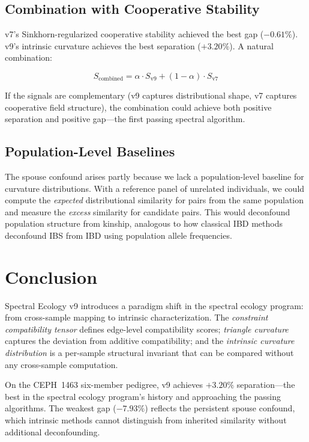 \documentclass{../yalumba}
\begin{document}
\subsection{Combination with Cooperative Stability}

v7's Sinkhorn-regularized cooperative stability achieved the best gap
($-0.61\%$).  v9's intrinsic curvature achieves the best separation
($+3.20\%$).  A natural combination:

\begin{equation}
  S_{\text{combined}} = \alpha \cdot S_{\text{v9}} + (1 - \alpha) \cdot
    S_{\text{v7}}
  \label{eq:combined}
\end{equation}

If the signals are complementary (v9 captures distributional shape, v7
captures cooperative field structure), the combination could achieve
both positive separation and positive gap---the first passing spectral
algorithm.

\subsection{Population-Level Baselines}

The spouse confound arises partly because we lack a population-level
baseline for curvature distributions.  With a reference panel of unrelated
individuals, we could compute the \emph{expected} distributional similarity
for pairs from the same population and measure the \emph{excess} similarity
for candidate pairs.  This would deconfound population structure from
kinship, analogous to how classical IBD methods deconfound IBS from IBD
using population allele frequencies.


\section{Conclusion}
\label{sec:conclusion}

Spectral Ecology v9 introduces a paradigm shift in the spectral ecology
program: from cross-sample mapping to intrinsic characterization.  The
\emph{constraint compatibility tensor} defines edge-level compatibility
scores; \emph{triangle curvature} captures the deviation from additive
compatibility; and the \emph{intrinsic curvature distribution} is a
per-sample structural invariant that can be compared without any cross-sample
computation.

On the CEPH~1463 six-member pedigree, v9 achieves $+3.20\%$ separation---the
best in the spectral ecology program's history and approaching the passing
algorithms.  The weakest gap ($-7.93\%$) reflects the persistent spouse
confound, which intrinsic methods cannot distinguish from inherited
similarity without additional deconfounding.
\end{document}
